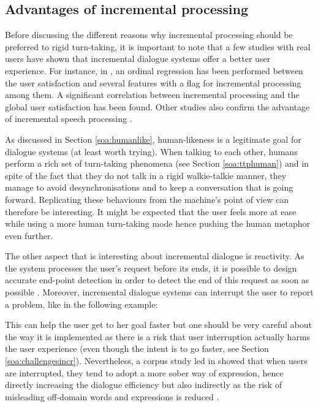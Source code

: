       \subsection{Advantages of incremental processing}

                Before discussing the different reasons why incremental processing should be preferred to rigid turn-taking, it is important to note that a few studies with real users have shown that incremental dialogue systems offer a better user experience. For instance, in \cite{Aist2007}, an ordinal regression has been performed between the user satisfaction and several features with a flag for incremental processing among them. A significant correlation between incremental processing and the global user satisfaction has been found. Other studies also confirm the advantage of incremental speech processing \cite{Skantze2009,El-Asri2014a,Zhao2015}.

                As discussed in Section \ref{soa:humanlike}, human-likeness is a legitimate goal for dialogue systems (at least worth trying). When talking to each other, humans perform a rich set of turn-taking phenomena (see Section \ref{soa:ttphuman}) and in spite of the fact that they do not talk in a rigid walkie-talkie manner, they manage to avoid desynchronisations and to keep a conversation that is going forward. Replicating these behaviours from the machine's point of view can therefore be interesting. It might be expected that the user feels more at ease while using a more human turn-taking mode hence pushing the human metaphor even further.

                The other aspect that is interesting about incremental dialogue is reactivity. As the system processes the user's request before its ends, it is possible to design accurate end-point detection in order to detect the end of this request as soon as possible \cite{Raux2008}. Moreover, incremental dialogue systems can interrupt the user to report a problem, like in the following example:
                
                \begin{dialogue}
                  \end{dialogue}
                  
                  This can help the user get to her goal faster but one should be very careful about the way it is implemented as there is a risk that user interruption actually harms the user experience (even though the intent is to go faster, see Section \ref{soa:challengesincr}). Nevertheless, a corpus study led in \cite{Ghigi2014} showed that when users are interrupted, they tend to adopt a more sober way of expression, hence directly increasing the dialogue efficiency but also indirectly as the risk of misleading off-domain words and expressions is reduced \cite{Zhao2015}.
                  
